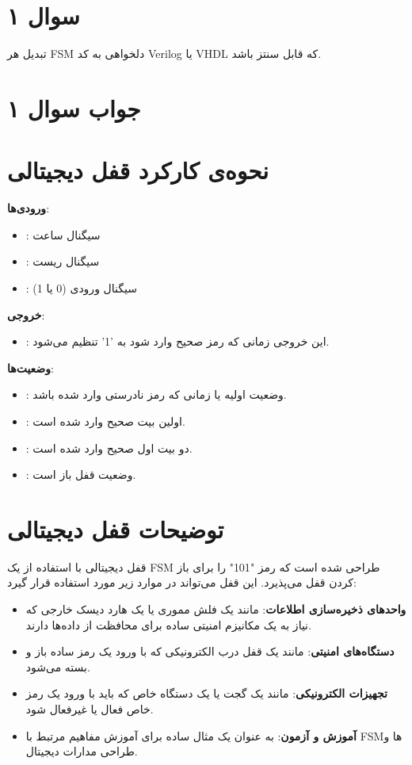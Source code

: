 \section*{سوال ۱}

تبدیل هر FSM دلخواهی به کد Verilog یا VHDL که قابل سنتز باشد.

\section*{جواب سوال ۱}

\section*{نحوه‌ی کارکرد قفل دیجیتالی}

\noindent \textbf{ورودی‌ها}:
\begin{itemize}
	\item {}: سیگنال ساعت
	\item {}: سیگنال ریست
	\item {}: سیگنال ورودی (0 یا 1)
\end{itemize}

\noindent \textbf{خروجی}:
\begin{itemize}
	\item {}: این خروجی زمانی که رمز صحیح وارد شود به '1' تنظیم می‌شود.
\end{itemize}

\noindent \textbf{وضعیت‌ها}:
\begin{itemize}
	\item {}: وضعیت اولیه یا زمانی که رمز نادرستی وارد شده باشد.
	\item {}: اولین بیت صحیح وارد شده است.
	\item {}: دو بیت اول صحیح وارد شده است.
	\item {}: وضعیت قفل باز است.
\end{itemize}

\newpage

\section*{توضیحات قفل دیجیتالی}
قفل دیجیتالی با استفاده از یک FSM طراحی شده است که رمز "101" را برای باز کردن قفل می‌پذیرد. این قفل می‌تواند در موارد زیر مورد استفاده قرار گیرد:

\begin{itemize}
	\item \textbf{واحدهای ذخیره‌سازی اطلاعات}: مانند یک فلش مموری یا یک هارد دیسک خارجی که نیاز به یک مکانیزم امنیتی ساده برای محافظت از داده‌ها دارند.
	
	\item \textbf{دستگاه‌های امنیتی}: مانند یک قفل درب الکترونیکی که با ورود یک رمز ساده باز و بسته می‌شود.
	
	\item \textbf{تجهیزات الکترونیکی}: مانند یک گجت یا یک دستگاه خاص که باید با ورود یک رمز خاص فعال یا غیرفعال شود.
	
	\item \textbf{آموزش و آزمون}: به عنوان یک مثال ساده برای آموزش مفاهیم مرتبط با FSM‌ها و طراحی مدارات دیجیتال.
\end{itemize}

